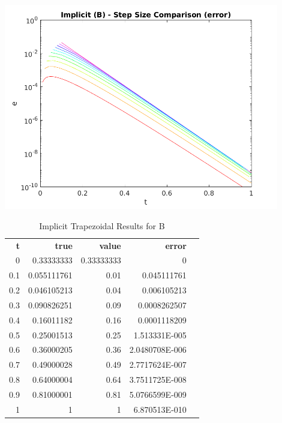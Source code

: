 \documentclass{article}
\begin{document}
\begin{center}
  \includegraphics[width=0.9\textwidth]{../output/b_implicit_h_err.png}
  \label{fig:b_implicit_h_err}
\end{center}

\begin{table}
\footnotesize
\centering
\caption{Implicit Trapezoidal Results for B}
\label{tab:b_implcit}
\begin{tabular}{rrrrl}
\textbf{t} & \textbf{true} & \textbf{value} & \textbf{error} &  \\
0          & 0.33333333    & 0.33333333     & 0              &  \\
0.1        & 0.055111761   & 0.01           & 0.045111761    &  \\
0.2        & 0.046105213   & 0.04           & 0.006105213    &  \\
0.3        & 0.090826251   & 0.09           & 0.0008262507   &  \\
0.4        & 0.16011182    & 0.16           & 0.0001118209   &  \\
0.5        & 0.25001513    & 0.25           & 1.513331E-005  &  \\
0.6        & 0.36000205    & 0.36           & 2.0480708E-006 &  \\
0.7        & 0.49000028    & 0.49           & 2.7717624E-007 &  \\
0.8        & 0.64000004    & 0.64           & 3.7511725E-008 &  \\
0.9        & 0.81000001    & 0.81           & 5.0766599E-009 &  \\
1          & 1             & 1              & 6.870513E-010  & 
\end{tabular}
\end{table}
\end{document}
